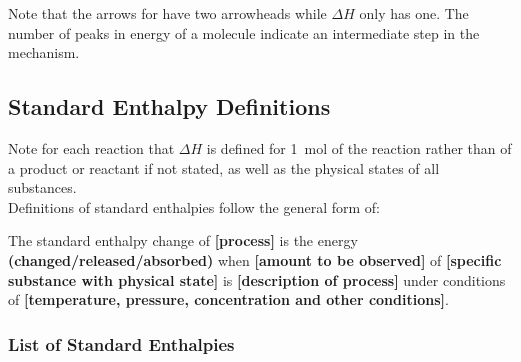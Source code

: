 \documentclass[../main]{subfiles}
\begin{document}
	Note that the arrows for  have two arrowheads while \(\Delta H\) only has one. The number of peaks in energy of a molecule indicate an intermediate step in the mechanism.

	\subsection{Standard Enthalpy Definitions}



	Note for each reaction that \(\Delta H\) is defined for \SI{1}{\mol} of the reaction rather than of a product or reactant if not stated, as well as the physical states of all substances. \\

	Definitions of standard enthalpies follow the general form of:

	\begin{center}
	The standard enthalpy change of \textbf{[process]} is the energy \textbf{(changed/released/absorbed)} when \textbf{[amount to be observed]} of \textbf{[specific substance with physical state]} is \textbf{[description of process]} under conditions of \textbf{[temperature, pressure, concentration and other conditions]}.
	\end{center}

	\subsubsection{List of Standard Enthalpies}
\end{document}
